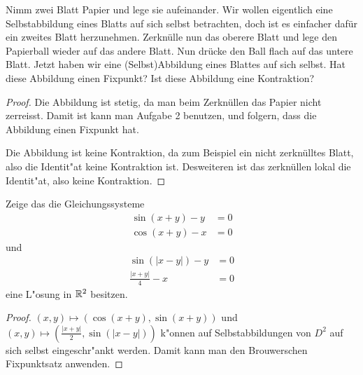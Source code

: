 \documentclass[a4paper,10pt]{article}
\begin{document}
\begin{Aufg}
Nimm zwei Blatt Papier und lege sie aufeinander. Wir wollen eigentlich eine Selbstabbildung
eines Blatts auf sich selbst betrachten, doch ist es einfacher dafür ein zweites Blatt herzunehmen.
Zerknülle nun das oberere Blatt und lege den Papierball wieder auf das andere Blatt. Nun drücke den 
Ball flach auf das untere Blatt. Jetzt haben wir eine (Selbst)Abbildung eines Blattes auf sich selbst.
Hat diese Abbildung einen Fixpunkt? Ist diese Abbildung eine Kontraktion?
 
\end{Aufg}
\begin{proof}
 Die Abbildung ist stetig, da man beim Zerknüllen das Papier nicht zerreisst.  Damit ist kann man 
 Aufgabe 2 benutzen, und folgern, dass die Abbildung einen Fixpunkt hat. 
 
 Die Abbildung ist keine Kontraktion, da zum Beispiel ein nicht zerknülltes Blatt, also die Identit"at 
 keine Kontraktion ist. Desweiteren ist das zerknüllen lokal die Identit"at, also keine Kontraktion.
 
\end{proof}


\begin{Aufg}
 Zeige das die Gleichungssysteme
 \begin{align*}
  \sin(x+y) - y &=0 \\           
  \cos(x+y) - x &=0
 \end{align*}
 und
  \begin{align*}
  \sin(|x-y|) - y &=0 \\           
  \frac{|x+y|}{4} - x &=0
 \end{align*}
eine L"osung in $\mathbb{R}^2$ besitzen.
\end{Aufg}

\begin{proof}
 
$(x,y)\mapsto (\cos(x+y),\sin(x+y))$ und $(x,y)\mapsto (\frac{|x+y|}{2},\sin(|x-y|))$ k"onnen
auf Selbstabbildungen von $D^2$ auf sich selbst eingeschr"ankt werden. Damit kann man den
Brouwerschen Fixpunktsatz anwenden.
\end{proof}
\end{document}
